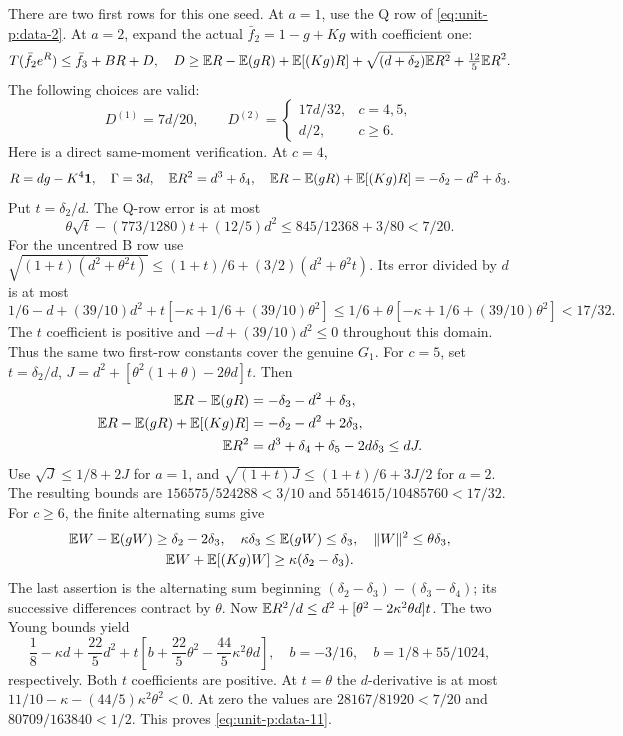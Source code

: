 There are two first rows for this one seed. At \(a=1\), use
the Q row of \eqref{eq:unit-p:data-2}. At \(a=2\), expand the actual
\(\bar f_2=1-g+Kg\) with coefficient one:
\begin{equation}\label{eq:unit-p:data-10}
T(\bar f_2e^R)\le\bar f_3+BR+D,\quad
 D\ge\mathbb E R-\mathbb E(gR)+\mathbb E[(Kg)R]
                  +\sqrt{(d+\delta_2)\mathbb E R^2}
                  +\tfrac{12}{5}\mathbb E R^2 .
\end{equation}
The following choices are valid:
\begin{equation}\label{eq:unit-p:data-11}
D^{(1)}=7d/20,\qquad
 D^{(2)}=
 \begin{cases}17d/32,&c=4,5,\\ d/2,&c\ge6.\end{cases}
\end{equation}
Here is a direct same-moment verification. At \(c=4\),
\[
 R=dg-K^4\mathbf1,\quad \Gamma=3d,\quad
 \mathbb E R^2=d^3+\delta_4,\quad
 \mathbb E R-\mathbb E(gR)+\mathbb E[(Kg)R]=-\delta_2-d^2+\delta_3 .
\]
Put \(t=\delta_2/d\).
The Q-row error is at most
\[
 \theta\sqrt t-(773/1280)t+(12/5)d^2
 \le845/12368+3/80<7/20.
\]
For the uncentred B row use
\(\sqrt{(1+t)(d^2+\theta^2t)}
 \le(1+t)/6+(3/2)(d^2+\theta^2t)\).
Its error divided by \(d\) is at most
\[
 1/6-d+(39/10)d^2+
             t[-\kappa+1/6+(39/10)\theta^2]
 \le1/6+\theta[-\kappa+1/6+(39/10)\theta^2]<17/32 .
\]
The \(t\) coefficient is positive and
\(-d+(39/10)d^2\le0\) throughout this domain.
Thus the same two first-row constants cover the genuine \(G_1\).
For \(c=5\), set
\(t=\delta_2/d\), \(J=d^2+[\theta^2(1+\theta)-2\theta d]t\).
Then
\[
\begin{aligned}
 \mathbb E R-\mathbb E(gR)&=-\delta_2-d^2+\delta_3,\\
 \mathbb E R-\mathbb E(gR)+\mathbb E[(Kg)R]&=-\delta_2-d^2+2\delta_3,\\
 \mathbb E R^2&=d^3+\delta_4+\delta_5-2d\delta_3\le dJ .
\end{aligned}
\]
Use \(\sqrt J\le1/8+2J\) for \(a=1\), and
\(\sqrt{(1+t)J}\le(1+t)/6+3J/2\) for \(a=2\).
The resulting bounds are \(156575/524288<3/10\) and
\(5514615/10485760<17/32\).
For \(c\ge6\), the finite alternating sums give
\[
\begin{gathered}
 \mathbb E W-\mathbb E(gW)\ge\delta_2-2\delta_3,\quad
 \kappa\delta_3\le\mathbb E(gW)\le\delta_3,\quad
 \|W\|^2\le\theta\delta_3,\\
 \mathbb E W+\mathbb E[(Kg)W]\ge\kappa(\delta_2-\delta_3).
\end{gathered}
\]
The last assertion is the alternating sum beginning
\((\delta_2-\delta_3)-(\delta_3-\delta_4)\); its successive
differences contract by \(\theta\).
Now \(\mathbb E R^2/d\le d^2+[\theta^2-2\kappa^2\theta d]t\).
The two Young bounds yield
\[
 \frac18-\kappa d+\frac{22}{5}d^2+
 t\left[b+\frac{22}{5}\theta^2
                   -\frac{44}{5}\kappa^2\theta d\right],
 \quad b=-3/16,\quad b=1/8+55/1024,
\]
respectively. Both \(t\) coefficients are positive. At \(t=\theta\)
the \(d\)-derivative is at most
\(11/10-\kappa-(44/5)\kappa^2\theta^2<0\).
At zero the values are \(28167/81920<7/20\) and
\(80709/163840<1/2\). This proves \eqref{eq:unit-p:data-11}.

